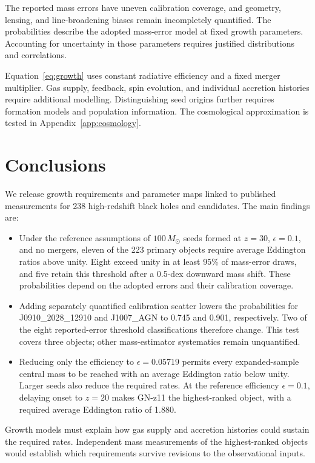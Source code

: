 \documentclass[pdflatex,sn-basic]{sn-jnl}
\begin{document}
The reported mass errors have uneven calibration coverage, and geometry,
lensing, and line-broadening biases remain incompletely quantified.
The probabilities describe the adopted mass-error model at fixed growth
parameters. Accounting for uncertainty in those parameters requires justified
distributions and correlations.

Equation~\ref{eq:growth} uses constant radiative efficiency and a fixed
merger multiplier. Gas supply, feedback, spin evolution, and individual
accretion histories require additional modelling. Distinguishing seed origins
further requires formation models and population information.
The cosmological approximation is tested in Appendix~\ref{app:cosmology}.


\section{Conclusions}

We release growth requirements and parameter maps linked to published
measurements for 238 high-redshift black holes and candidates. The main
findings are:
\begin{itemize}
\item Under the reference assumptions of $100\,M_\odot$ seeds formed at
$z=30$, $\epsilon=0.1$, and no mergers, eleven of the 223 primary objects
require average Eddington ratios above unity. Eight exceed unity in at
least 95\% of mass-error draws, and five retain this threshold after a
0.5-dex downward mass shift. These probabilities depend on the adopted
errors and their calibration coverage.
\item Adding separately quantified calibration scatter lowers the
probabilities for J0910\_2028\_12910 and J1007\_AGN to 0.745 and 0.901,
respectively. Two of the eight reported-error threshold classifications
therefore change. This test covers three objects; other mass-estimator
systematics remain unquantified.
\item Reducing only the efficiency to $\epsilon=0.05719$ permits every
expanded-sample central mass to be reached with an average Eddington ratio
below unity. Larger seeds also reduce the required rates. At the reference
efficiency $\epsilon=0.1$, delaying onset to $z=20$ makes GN-z11 the
highest-ranked object, with a required average Eddington ratio of 1.880.
\end{itemize}

Growth models must explain how gas supply and accretion histories could
sustain the required rates. Independent mass measurements of the
highest-ranked objects would establish which requirements survive revisions
to the observational inputs.
\end{document}
